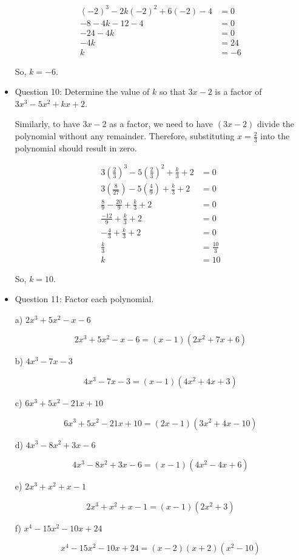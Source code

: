 \documentclass{article}
\begin{document}
\begin{itemize}
\[
\begin{aligned}
    (-2)^3 - 2k(-2)^2 + 6(-2) - 4 &= 0 \\
    -8 - 4k - 12 - 4 &= 0 \\
    -24 - 4k &= 0 \\
    -4k &= 24 \\
    k &= -6
\end{aligned}
\]

So, $k = -6$.
\item Question 10:
Determine the value of $k$ so that $3x - 2$ is a factor of $3x^3 - 5x^2 + kx + 2$.

Similarly, to have $3x - 2$ as a factor, we need to have $(3x - 2)$ divide the polynomial without any remainder. Therefore, substituting $x = \frac{2}{3}$ into the polynomial should result in zero.

\[
\begin{aligned}
    3\left(\frac{2}{3}\right)^3 - 5\left(\frac{2}{3}\right)^2 + \frac{k}{3} + 2 &= 0 \\
    3\left(\frac{8}{27}\right) - 5\left(\frac{4}{9}\right) + \frac{k}{3} + 2 &= 0 \\
    \frac{8}{9} - \frac{20}{9} + \frac{k}{3} + 2 &= 0 \\
    \frac{-12}{9} + \frac{k}{3} + 2 &= 0 \\
    -\frac{4}{3} + \frac{k}{3} + 2 &= 0 \\
    \frac{k}{3} &= \frac{10}{3} \\
    k &= 10
\end{aligned}
\]

So, $k = 10$.

\item Question 11:
Factor each polynomial.

a) $2x^3 + 5x^2 - x - 6$

\[
2x^3 + 5x^2 - x - 6 = (x - 1)(2x^2 + 7x + 6)
\]

b) $4x^3 - 7x - 3$

\[
4x^3 - 7x - 3 = (x - 1)(4x^2 + 4x + 3)
\]

c) $6x^3 + 5x^2 - 21x + 10$

\[
6x^3 + 5x^2 - 21x + 10 = (2x - 1)(3x^2 + 4x - 10)
\]

d) $4x^3 - 8x^2 + 3x - 6$

\[
4x^3 - 8x^2 + 3x - 6 = (x - 1)(4x^2 - 4x + 6)
\]

e) $2x^3 + x^2 + x - 1$

\[
2x^3 + x^2 + x - 1 = (x - 1)(2x^2 + 3)
\]

f) $x^4 - 15x^2 - 10x + 24$

\[
x^4 - 15x^2 - 10x + 24 = (x - 2)(x + 2)(x^2 - 10)
\]



\end{itemize}
\end{document}
